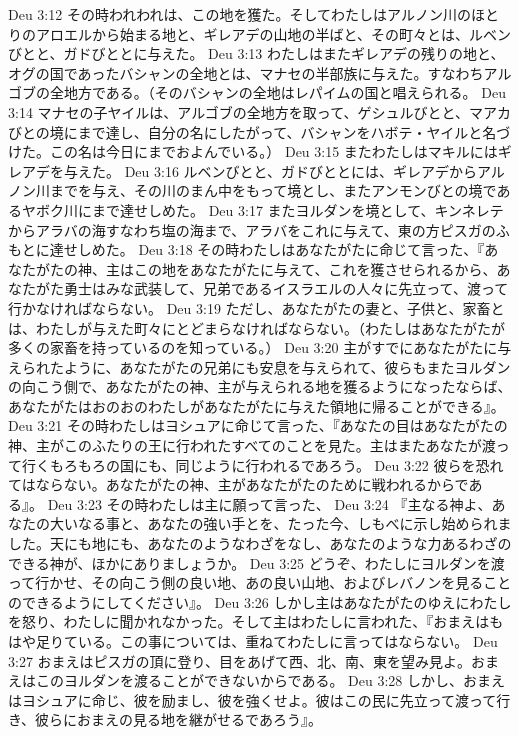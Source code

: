 Deu 3:12  その時われわれは、この地を獲た。そしてわたしはアルノン川のほとりのアロエルから始まる地と、ギレアデの山地の半ばと、その町々とは、ルベンびとと、ガドびととに与えた。
Deu 3:13  わたしはまたギレアデの残りの地と、オグの国であったバシャンの全地とは、マナセの半部族に与えた。すなわちアルゴブの全地方である。（そのバシャンの全地はレパイムの国と唱えられる。
Deu 3:14  マナセの子ヤイルは、アルゴブの全地方を取って、ゲシュルびとと、マアカびとの境にまで達し、自分の名にしたがって、バシャンをハボテ・ヤイルと名づけた。この名は今日にまでおよんでいる。）
Deu 3:15  またわたしはマキルにはギレアデを与えた。
Deu 3:16  ルベンびとと、ガドびととには、ギレアデからアルノン川までを与え、その川のまん中をもって境とし、またアンモンびとの境であるヤボク川にまで達せしめた。
Deu 3:17  またヨルダンを境として、キンネレテからアラバの海すなわち塩の海まで、アラバをこれに与えて、東の方ピスガのふもとに達せしめた。
Deu 3:18  その時わたしはあなたがたに命じて言った、『あなたがたの神、主はこの地をあなたがたに与えて、これを獲させられるから、あなたがた勇士はみな武装して、兄弟であるイスラエルの人々に先立って、渡って行かなければならない。
Deu 3:19  ただし、あなたがたの妻と、子供と、家畜とは、わたしが与えた町々にとどまらなければならない。（わたしはあなたがたが多くの家畜を持っているのを知っている。）
Deu 3:20  主がすでにあなたがたに与えられたように、あなたがたの兄弟にも安息を与えられて、彼らもまたヨルダンの向こう側で、あなたがたの神、主が与えられる地を獲るようになったならば、あなたがたはおのおのわたしがあなたがたに与えた領地に帰ることができる』。
Deu 3:21  その時わたしはヨシュアに命じて言った、『あなたの目はあなたがたの神、主がこのふたりの王に行われたすべてのことを見た。主はまたあなたが渡って行くもろもろの国にも、同じように行われるであろう。
Deu 3:22  彼らを恐れてはならない。あなたがたの神、主があなたがたのために戦われるからである』。
Deu 3:23  その時わたしは主に願って言った、
Deu 3:24  『主なる神よ、あなたの大いなる事と、あなたの強い手とを、たった今、しもべに示し始められました。天にも地にも、あなたのようなわざをなし、あなたのような力あるわざのできる神が、ほかにありましょうか。
Deu 3:25  どうぞ、わたしにヨルダンを渡って行かせ、その向こう側の良い地、あの良い山地、およびレバノンを見ることのできるようにしてください』。
Deu 3:26  しかし主はあなたがたのゆえにわたしを怒り、わたしに聞かれなかった。そして主はわたしに言われた、『おまえはもはや足りている。この事については、重ねてわたしに言ってはならない。
Deu 3:27  おまえはピスガの頂に登り、目をあげて西、北、南、東を望み見よ。おまえはこのヨルダンを渡ることができないからである。
Deu 3:28  しかし、おまえはヨシュアに命じ、彼を励まし、彼を強くせよ。彼はこの民に先立って渡って行き、彼らにおまえの見る地を継がせるであろう』。
